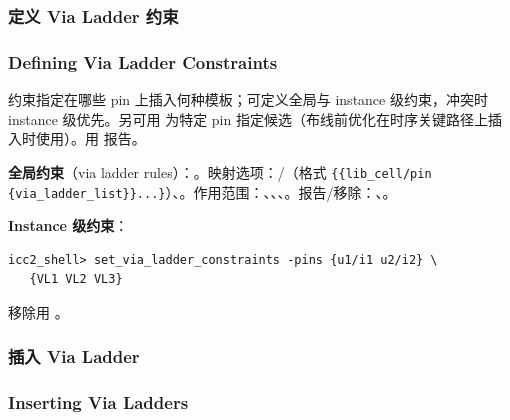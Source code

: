 \subsubsection{定义 Via Ladder 约束}
\subsubsection*{Defining Via Ladder Constraints}

约束指定在哪些 pin 上插入何种模板；可定义全局与 instance 级约束，冲突时 instance 级优先。另可用  为特定 pin 指定候选（布线前优化在时序关键路径上插入时使用）。用  报告。

\textbf{全局约束}（via ladder rules）：。映射选项：/（格式 \texttt{\{\{lib\_cell/pin \{via\_ladder\_list\}\}...\}}）、。作用范围：、、、。报告/移除：、。

\textbf{Instance 级约束}：
\begin{lstlisting}
icc2_shell> set_via_ladder_constraints -pins {u1/i1 u2/i2} \
   {VL1 VL2 VL3}
\end{lstlisting}
移除用 。

\subsubsection{插入 Via Ladder}
\subsubsection*{Inserting Via Ladders}

